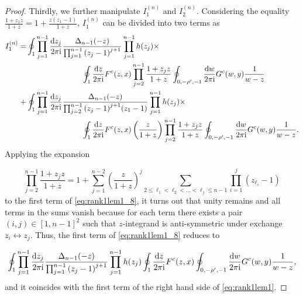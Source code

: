 \documentclass[cmp]{svjour}
\numberwithin{theorem}{section}
\numberwithin{equation}{section}
\def\dd{{\rm d}}
\def\ii{{\rm i}}
\begin{document}
\begin{proof}
Thirdly, we further manipulate $I_1^{(n)}$ and $I_2^{(n)}$.  Considering the equality $\frac{1 + z_1 z}{1 + z} =  1 + \frac{ z(z_1 - 1) }{1 + z} $, $I_1^{(n)}$ can be divided into two terms as
%
\begin{equation}
\label{eq:rank1lem1_8}
\begin{split}
I_1^{(n)} = & \oint_{1} \prod_{j=1}^{n-1}{ \frac{\dd z_j}{2 \pi \ii} } \frac{ \Delta_{n-1}(-z) }{ \prod_{j=1}^{n-1}{{(z_j -1)}^{j+1}} } \prod_{j=1}^{n-1}{h(z_j)}  \times \\
& \hspace{1in} \oint_{1} \frac{\dd z}{2 \pi \ii} F^c(z, x) \prod_{j=2}^{n-1}{ \frac{1 + z_j z}{1 + z} }  \oint_{0 , - \rho' , -1  } \frac{\dd w}{2 \pi \ii} G^c(w, y)   \frac{1}{w-z} \\
+ &  \oint_{1} \prod_{j=1}^{n-1}{ \frac{\dd z_j}{2 \pi \ii} } \frac{ \Delta_{n-1}(-z) }{ \prod_{j=2}^{n-1}{{(z_j -1)}^{j+1}} (z_1 - 1) } \prod_{j=1}^{n-1}{h(z_j)} \times \\
& \hspace{1in}  \oint_{1} \frac{\dd z}{2 \pi \ii} F^c(z, x) \left( \frac{z}{1 + z} \right)  \prod_{j=2}^{n-1}{ \frac{1 + z_j z}{1 + z} } 
\oint_{0 , - \rho' , -1  } \frac{\dd w}{2 \pi \ii} G^c(w, y)  \frac{1}{w-z} .
\end{split}
\end{equation}
Applying the expansion

\begin{equation}
\label{eq:rank1lem1_9}
\prod_{j=2}^{n-1}{ \frac{1 + z_j z}{1 + z} } =   1  +   \sum_{j=1}^{n-2}{ { \left( \frac{z}{1 + z} \right) }^{j} \sum_{2 \leq \ell_1 < \ell_2 < \dots < \ell_j \leq n-1 }{ \prod_{i=1}^{j}{ (z_{\ell_i} - 1) } } }
\end{equation}
to the first term of \eqref{eq:rank1lem1_8}, it turns out that unity remains and all terms in the sums vanish because for each term there exists a pair $(i , j) \in {[1,n-1]}^2$ such that $z$-integrand is anti-symmetric under exchange $z_i \leftrightarrow z_j$. Thus, the first term of \eqref{eq:rank1lem1_8} reduces to


\begin{equation*}
\label{eq:rank1lem1_10}
\oint_{1} \prod_{j=1}^{n-1}{ \frac{\dd z_j}{2 \pi \ii} } \frac{ \Delta_{n-1}(-z)}{ \prod_{j=1}^{n-1}{{(z_j -1)}^{j+1}} } \prod_{j=1}^{n-1}{h(z_j)} \oint_{1} \frac{\dd z}{2 \pi \ii} F^c(z, x)  \oint_{0 , - \rho' , -1  } \frac{\dd w}{2 \pi \ii} G^c(w, y)  \frac{1}{w-z},
\end{equation*}
and it coincides with the first term of the right hand side of \eqref{eq:rank1lem1}.


\end{proof}
\end{document}
